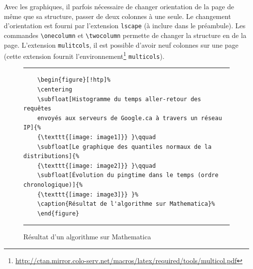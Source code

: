 \onecolumn
%
\par Avec les graphiques, il parfois nécessaire de changer orientation de la page de même que sa structure, passer de deux colonnes à une seule. Le changement d'orientation est fourni par l'extension \verb|lscape| (à inclure dans le préambule). Les commandes \verb|\onecolumn| et \verb|\twocolumn| permette de changer la structure en de la page. L'extension \verb|mulitcols|, il est possible d'avoir neuf colonnes sur une page (cette extension fournit l'environnement\footnote{\url{http://ctan.mirror.colo-serv.net/macros/latex/required/tools/multicol.pdf}} \verb|multicols|).

%
\begin{figure}[H]
	\centering
	\qquad
	\qquad
	\caption{Résultat d'un algorithme sur Mathematica}%
	\label{fig:example}%
	\hrule
	\begin{verbatim}
	\begin{figure}[!htp]%
	\centering
	\subfloat[Histogramme du temps aller-retour des requêtes
	envoyés aux serveurs de Google.ca à travers un réseau IP]{%
	{\texttt{[image: image1]}} }\qquad
	\subfloat[Le graphique des quantiles normaux de la distributions]{%
	{\texttt{[image: image2]}} }\qquad
	\subfloat[Évolution du pingtime dans le temps (ordre chronologique)]{%
	{\texttt{[image: image3]}} }%
	\caption{Résultat de l'algorithme sur Mathematica}%
	\end{figure}
	\end{verbatim}
	\hrule
\end{figure}
